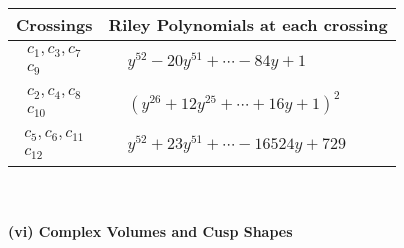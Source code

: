 \documentclass[1p]{elsarticle_modified}
\theoremstyle{definition}
\begin{document}
\begin{tabular}{m{50pt}|m{274pt}}
Crossings & \hspace{64pt}Riley Polynomials at each crossing \\
\hline $$\begin{aligned}c_{1},c_{3},c_{7}\\c_{9}\end{aligned}$$&$\begin{aligned}
&y^{52}-20 y^{51}+\cdots-84 y+1
\end{aligned}$\\
\hline $$\begin{aligned}c_{2},c_{4},c_{8}\\c_{10}\end{aligned}$$&$\begin{aligned}
&(y^{26}+12 y^{25}+\cdots+16 y+1)^{2}
\end{aligned}$\\
\hline $$\begin{aligned}c_{5},c_{6},c_{11}\\c_{12}\end{aligned}$$&$\begin{aligned}
&y^{52}+23 y^{51}+\cdots-16524 y+729
\end{aligned}$\\
\hline
\end{tabular}\\~\\
\newpage\flushleft \textbf{(vi) Complex Volumes and Cusp Shapes}
\end{document}
